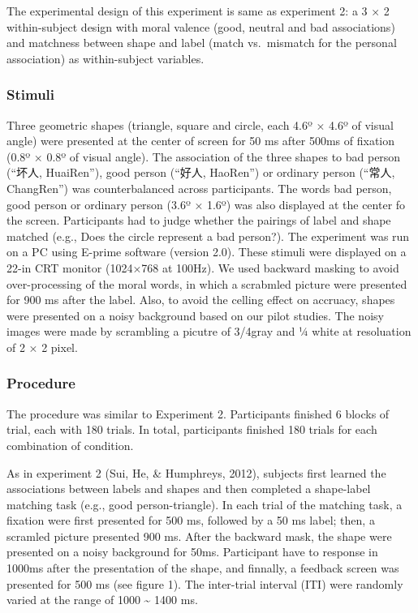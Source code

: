 \documentclass[man]{apa6}
\begin{document}
The experimental design of this experiment is same as experiment 2: a 3 × 2 within-subject design with moral valence (good, neutral and bad associations) and matchness between shape and label (match vs.~mismatch for the personal association) as within-subject variables.

\hypertarget{stimuli-3}{%
\subsubsection{Stimuli}\label{stimuli-3}}

Three geometric shapes (triangle, square and circle, each 4.6º × 4.6º of visual angle) were presented at the center of screen for 50 ms after 500ms of fixation (0.8º × 0.8º of visual angle). The association of the three shapes to bad person (\enquote{坏人, HuaiRen}), good person (\enquote{好人, HaoRen}) or ordinary person (\enquote{常人, ChangRen}) was counterbalanced across participants. The words bad person, good person or ordinary person (3.6º × 1.6º) was also displayed at the center fo the screen. Participants had to judge whether the pairings of label and shape matched (e.g., Does the circle represent a bad person?). The experiment was run on a PC using E-prime software (version 2.0). These stimuli were displayed on a 22-in CRT monitor (1024×768 at 100Hz).
We used backward masking to avoid over-processing of the moral words, in which a scrabmled picture were presented for 900 ms after the label. Also, to avoid the celling effect on accruacy, shapes were presented on a noisy background based on our pilot studies. The noisy images were made by scrambling a picutre of 3/4gray and ¼ white at resoluation of 2 × 2 pixel.

\hypertarget{procedure-8}{%
\subsubsection{Procedure}\label{procedure-8}}

The procedure was similar to Experiment 2. Participants finished 6 blocks of trial, each with 180 trials. In total, participants finished 180 trials for each combination of condition.

As in experiment 2 (Sui, He, \& Humphreys, 2012), subjects first learned the associations between labels and shapes and then completed a shape-label matching task (e.g., good person-triangle). In each trial of the matching task, a fixation were first presented for 500 ms, followed by a 50 ms label; then, a scramled picture presented 900 ms. After the backward mask, the shape were presented on a noisy background for 50ms. Participant have to response in 1000ms after the presentation of the shape, and finnally, a feedback screen was presented for 500 ms (see figure 1). The inter-trial interval (ITI) were randomly varied at the range of 1000 \textasciitilde{} 1400 ms.
\end{document}

